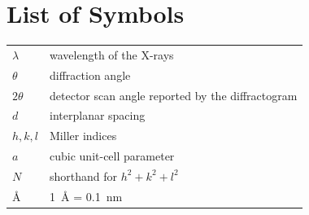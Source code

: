 \documentclass[11pt,a4paper]{article}
\begin{document}
\section*{List of Symbols}
\begin{tabular}{ll}
$\lambda$ & wavelength of the X-rays \\
$\theta$ & diffraction angle \\
$2\theta$ & detector scan angle reported by the diffractogram \\
$d$ & interplanar spacing \\
$h,k,l$ & Miller indices \\
$a$ & cubic unit-cell parameter \\
$N$ & shorthand for $h^2+k^2+l^2$ \\
\si{\angstrom} & \SI{1}{\angstrom} = \SI{0.1}{\nano\meter} \\
\end{tabular}



\end{document}
